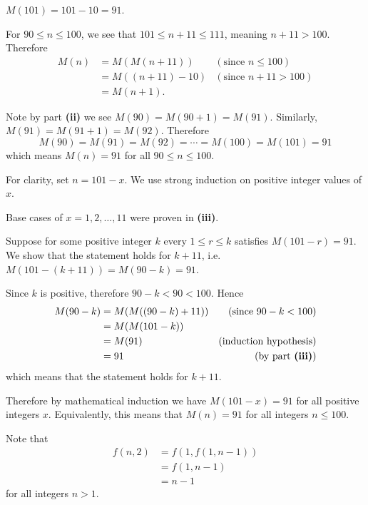 \begin{questions}
    \item \begin{partquestions}{\roman*}
        \item $M(101) = 101 - 10 = 91$.

        \item For $90 \leq n \leq 100$, we see that $101 \leq n+11 \leq 111$, meaning $n+11 > 100$. Therefore
        \begin{align*}
            M(n) &= M(M(n+11)) & (\text{since } n \leq 100)\\
            &= M((n+11) - 10) & (\text{since } n+11 > 100)\\
            &= M(n+1).
        \end{align*}

        \item Note by part \textbf{(ii)} we see $M(90) = M(90 + 1) = M(91)$. Similarly, $M(91) = M(91 + 1) = M(92)$. Therefore
        \[
            M(90) = M(91) = M(92) = \cdots = M(100) = M(101) = 91
        \]
        which means $M(n) = 91$ for all $90 \leq n \leq 100$.

        \item For clarity, set $n = 101 - x$. We use strong induction on positive integer values of $x$.

        Base cases of $x = 1, 2, \dots, 11$ were proven in \textbf{(iii)}.

        Suppose for some positive integer $k$ every $1 \leq r \leq k$ satisfies $M(101 - r) = 91$. We show that the statement holds for $k + 11$, i.e. $M(101 - (k+11)) = M(90 - k) = 91$.

        Since $k$ is positive, therefore $90 - k < 90 < 100$. Hence
        \begin{align*}
            M(90 - k) &= M(M((90 - k) + 11)) & (\text{since } 90-k < 100)\\
            &= M(M(101 - k))\\
            &= M(91) & (\text{induction hypothesis})\\
            &= 91 & (\text{by part \textbf{(iii)}})
        \end{align*}
        which means that the statement holds for $k + 11$.

        Therefore by mathematical induction we have $M(101 - x) = 91$ for all positive integers $x$. Equivalently, this means that $M(n) = 91$ for all integers $n \leq 100$.
    \end{partquestions}

    \item \begin{partquestions}{\roman*}
        \item Note that
        \begin{align*}
            f(n,2) &= f(1, f(1, n-1))\\
            &= f(1, n-1)\\
            &= n-1
        \end{align*}
        for all integers $n > 1$.


\end{partquestions}
\end{questions}
